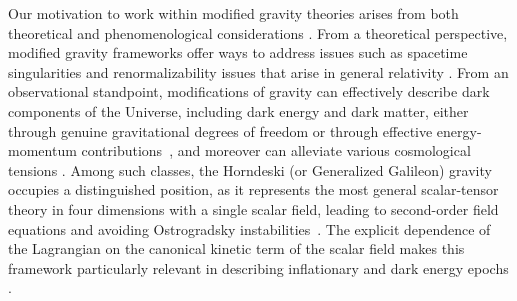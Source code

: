 \documentclass[nofootinbib,aps,a4paper,letterpaper,superscriptaddress,
twocolumn,times]{revtex4}
\renewcommand{\(}{\left(}
\renewcommand{\)}{\right)}
\renewcommand{\(}{\left(}
\renewcommand{\)}{\right)}
\renewcommand{\[}{\left[}
\renewcommand{\]}{\right]}
\begin{document}
Our motivation to work within modified gravity theories arises from both 
theoretical and phenomenological considerations \cite{CANTATA:2021asi}. From a 
theoretical perspective, modified gravity frameworks offer ways to address 
issues such as spacetime singularities and renormalizability issues that arise in 
general relativity \cite{Clifton:2011jh, Nojiri:2010wj}. From an observational 
standpoint, modifications of gravity can effectively describe dark components of 
the Universe, including dark energy and dark matter, either through genuine 
gravitational degrees of freedom or through effective energy-momentum 
contributions~\cite{Capozziello:2011et,Cai:2015emx}, and moreover can 
alleviate various cosmological tensions \cite{CosmoVerseNetwork:2025alb}. Among 
such classes, the Horndeski (or Generalized Galileon) gravity occupies a 
distinguished position, as it represents the most general scalar-tensor theory 
in four dimensions with a single scalar field, leading to second-order field 
equations and avoiding Ostrogradsky instabilities~\cite{Horndeski:1974wa, 
Deffayet:2011gz, Kobayashi:2011nu}. The explicit dependence of the Lagrangian on 
the canonical kinetic term of the scalar field makes this framework particularly 
relevant in describing inflationary and dark energy epochs \cite{ 
Deffayet:2013lga,Kase:2014yya,Tsujikawa:2014uza,Arroja:2015yvd, 
 Bellini:2015xja,DeFelice:2015isa,Babichev:2016rlq,BenAchour:2016cay, 
Pogosian:2016pwr,Arroja:2017msd,Ijjas:2017pei, 
 Capozziello:2018gms,Frusciante:2018jzw,Franchini:2019npi, 
 Heisenberg:2019qxz,Destounis:2019omd,Ilyas:2020qja, 
Oikonomou:2020sij,Dialektopoulos:2021ryi, 
Petronikolou:2021shp,Takahashi:2022mew, Horndeski:2024sjk}.
\end{document}
